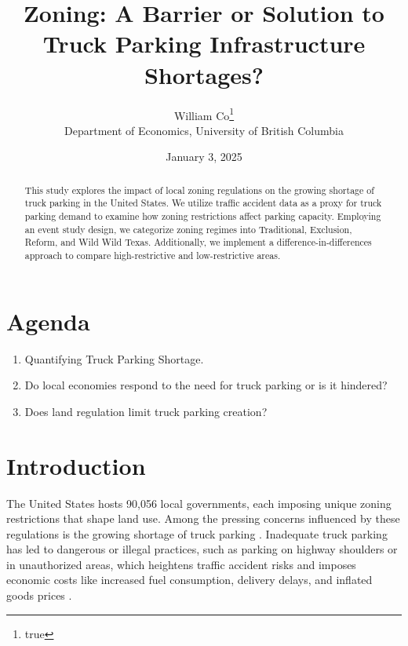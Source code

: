\documentclass[
  12pt]{article}
\begin{document}
\def\spacingset#1{\renewcommand{\baselinestretch}%
{#1}\small\normalsize} \spacingset{1}



\date{January 3, 2025}
\title{\bf Zoning: A Barrier or Solution to Truck Parking Infrastructure
Shortages?}
\author{
William Co\thanks{true}\\
Department of Economics, University of British Columbia\\
}
\maketitle

\bigskip
\bigskip
\begin{abstract}
This study explores the impact of local zoning regulations on the
growing shortage of truck parking in the United States. We utilize
traffic accident data as a proxy for truck parking demand to examine how
zoning restrictions affect parking capacity. Employing an event study
design, we categorize zoning regimes into Traditional, Exclusion,
Reform, and Wild Wild Texas. Additionally, we implement a
difference-in-differences approach to compare high-restrictive and
low-restrictive areas.
\end{abstract}


\newpage
\spacingset{1.9} %

\section{Agenda}\label{agenda}

\begin{enumerate}
\def\labelenumi{\arabic{enumi}.}
\item
  Quantifying Truck Parking Shortage.~
\item
  Do local economies respond to the need for truck parking or is it
  hindered?
\item
  Does land regulation limit truck parking creation?
\end{enumerate}

\section{Introduction}\label{sec-intro}

The United States hosts 90,056 local governments, each imposing unique
zoning restrictions that shape land use. Among the pressing concerns
influenced by these regulations is the growing shortage of truck parking
\citep{american-trucking-associationNationalTruckParking2023}.
Inadequate truck parking has led to dangerous or illegal practices, such
as parking on highway shoulders or in unauthorized areas, which
heightens traffic accident risks and imposes economic costs like
increased fuel consumption, delivery delays, and inflated goods prices
\citep{usdotJasonsLawTruck2015}.
\end{document}
